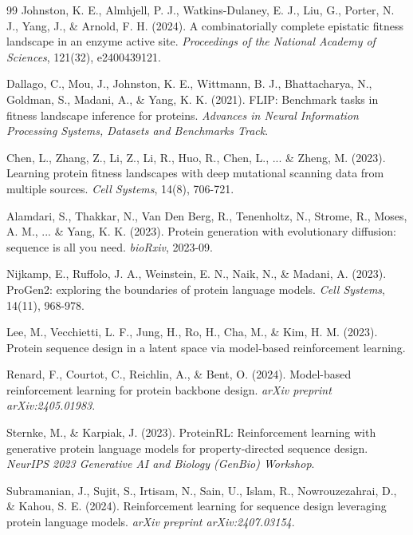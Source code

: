 \documentclass[12pt, a4paper]{article}
\begin{document}
\begin{thebibliography}{99}
Johnston, K. E., Almhjell, P. J., Watkins-Dulaney, E. J., Liu, G., Porter, N. J., Yang, J., \& Arnold, F. H. (2024). \newblock A combinatorially complete epistatic fitness landscape in an enzyme active site. \newblock \textit{Proceedings of the National Academy of Sciences}, 121(32), e2400439121.


Dallago, C., Mou, J., Johnston, K. E., Wittmann, B. J., Bhattacharya, N., Goldman, S., Madani, A., \& Yang, K. K. (2021). \newblock FLIP: Benchmark tasks in fitness landscape inference for proteins. \newblock \textit{Advances in Neural Information Processing Systems, Datasets and Benchmarks Track}.


Chen, L., Zhang, Z., Li, Z., Li, R., Huo, R., Chen, L., ... \& Zheng, M. (2023). \newblock Learning protein fitness landscapes with deep mutational scanning data from multiple sources. \newblock \textit{Cell Systems}, 14(8), 706-721.


Alamdari, S., Thakkar, N., Van Den Berg, R., Tenenholtz, N., Strome, R., Moses, A. M., ... \& Yang, K. K. (2023). \newblock Protein generation with evolutionary diffusion: sequence is all you need. \newblock \textit{bioRxiv}, 2023-09.


Nijkamp, E., Ruffolo, J. A., Weinstein, E. N., Naik, N., \& Madani, A. (2023). \newblock ProGen2: exploring the boundaries of protein language models. \newblock \textit{Cell Systems}, 14(11), 968-978.


Lee, M., Vecchietti, L. F., Jung, H., Ro, H., Cha, M., \& Kim, H. M. (2023). \newblock Protein sequence design in a latent space via model-based reinforcement learning.


Renard, F., Courtot, C., Reichlin, A., \& Bent, O. (2024). \newblock Model-based reinforcement learning for protein backbone design. \newblock \textit{arXiv preprint arXiv:2405.01983}.


Sternke, M., \& Karpiak, J. (2023). \newblock ProteinRL: Reinforcement learning with generative protein language models for property-directed sequence design. \newblock \textit{NeurIPS 2023 Generative AI and Biology (GenBio) Workshop}.


Subramanian, J., Sujit, S., Irtisam, N., Sain, U., Islam, R., Nowrouzezahrai, D., \& Kahou, S. E. (2024). \newblock Reinforcement learning for sequence design leveraging protein language models. \newblock \textit{arXiv preprint arXiv:2407.03154}.



\end{thebibliography}
\end{document}
